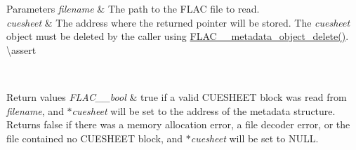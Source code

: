 \begin{DoxyParams}{Parameters}
{\em filename} & The path to the F\+L\+AC file to read. \\
\hline
{\em cuesheet} & The address where the returned pointer will be stored. The {\itshape cuesheet} object must be deleted by the caller using \mbox{\hyperlink{group__flac__metadata__object_ga66bbe27dba68ba77be5af83986a280ea}{F\+L\+A\+C\+\_\+\+\_\+metadata\+\_\+object\+\_\+delete()}}. \textbackslash{}assert 
\begin{DoxyCode}{1}
\end{DoxyCode}
 
\begin{DoxyCode}{1}
\end{DoxyCode}
 \\
\hline
\end{DoxyParams}

\begin{DoxyRetVals}{Return values}
{\em F\+L\+A\+C\+\_\+\+\_\+bool} & {\ttfamily true} if a valid C\+U\+E\+S\+H\+E\+ET block was read from {\itshape filename}, and {\itshape $\ast$cuesheet} will be set to the address of the metadata structure. Returns {\ttfamily false} if there was a memory allocation error, a file decoder error, or the file contained no C\+U\+E\+S\+H\+E\+ET block, and {\itshape $\ast$cuesheet} will be set to {\ttfamily N\+U\+LL}. \\
\hline
\end{DoxyRetVals}
\mbox{\label{group__flac__metadata__level0_gaa13138ab038694909964998a113817b4}} 
